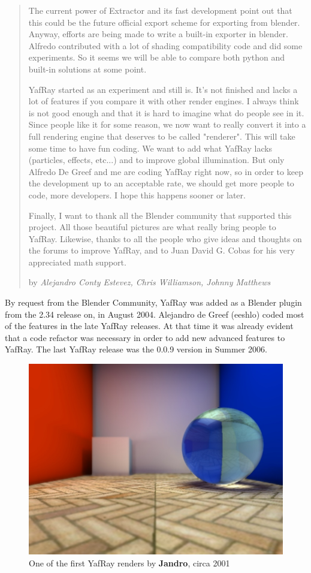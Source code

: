 \begin{quotation}
The current power of Extractor and its fast development point out that this could be the future official export scheme for exporting from blender. Anyway, efforts are being made to write a built-in exporter in blender. Alfredo contributed with a lot of shading compatibility code and did some experiments. So it seems we will be able to compare both python and built-in solutions at some point.

YafRay started as an experiment and still is. It's not finished and lacks a lot of features if you compare it with other render engines. I always think is not good enough and that it is hard to imagine what do people see in it. Since people like it for some reason, we now want to really convert it into a full rendering engine that deserves to be called "renderer". This will take some time to have fun coding. We want to add what YafRay lacks (particles, effects, etc...) and to improve global illumination. But only Alfredo De Greef and me are coding YafRay right now, so in order to keep the development up to an acceptable rate, we should get more people to code, more developers. I hope this happens sooner or later.

Finally, I want to thank all the Blender community that supported this project. All those beautiful pictures are what really bring people to YafRay. Likewise, thanks to all the people who give ideas and thoughts on the forums to improve YafRay, and to Juan David G. Cobas for his very appreciated math support.
\begin{flushright}
by \textit{Alejandro Conty Estevez, Chris Williamson, Johnny Matthews}
\end{flushright}
\end{quotation}

By request from the Blender Community, YafRay was added as a Blender plugin from the 2.34 release on, in August 2004. Alejandro de Greef (eeshlo) coded most of the features in the late YafRay releases. At that time it was already evident that a code refactor was necessary in order to add new advanced features to YafRay. The last YafRay release was the 0.0.9 version in Summer 2006.

\begin{figure}
    \includegraphics[width=.5\textwidth]{images/caurad_test.jpg}
    \caption{One of the first YafRay renders by \textbf{Jandro}, circa 2001}
\end{figure}

